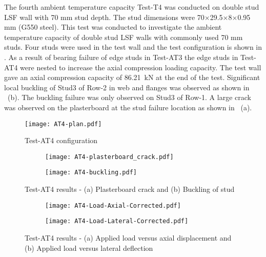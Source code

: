 The fourth ambient temperature capacity Test-T4 was conducted on double stud LSF wall with 70 mm stud depth. The stud dimensions were 70$\times$29.5$\times$8$\times$0.95 mm (G550 steel). This test was conducted to investigate the ambient temperature capacity of double stud LSF walls with commonly used 70 mm studs. Four studs were used in the test wall and the test configuration is shown in . As a result of bearing failure of edge studs in Test-AT3 the edge studs in Test-AT4 were nested to increase the axial compression loading capacity. The test wall gave an axial compression capacity of 86.21~kN at the end of the test. Significant local buckling of Stud3 of Row-2 in web and flanges was observed as shown in ~(b). The buckling failure was only observed on Stud3 of Row-1. A large crack was observed on the plasterboard at the stud failure location as shown in ~(a).
\begin{figure}[!htbp]
	\centering
			\texttt{[image: AT4-plan.pdf]}\\
		\caption{Test-AT4 configuration}
		\label{fig:AT4-plan}
\end{figure}  
\begin{figure}[!htbp]
	\centering
	\begin{subfigure}[b]{0.3\textwidth}
		\centering
		\texttt{[image: AT4-plasterboard\_crack.pdf]}
		\caption{}
		\label{subfig:AT4-plasterboard_crack}
	\end{subfigure}
	\begin{subfigure}[b]{0.3\textwidth}
		\centering
		\texttt{[image: AT4-buckling.pdf]}
		\caption{}
		\label{subfig:AT4-buckling}
	\end{subfigure}
	   \caption{Test-AT4 results - (a) Plasterboard crack and (b) Buckling of stud}
	   \label{fig:AT4-failure}
\end{figure}
\begin{figure}[!htbp]
	\centering
	\begin{subfigure}[b]{0.45\textwidth}
		\centering
		\texttt{[image: AT4-Load-Axial-Corrected.pdf]}
		\caption{}
		\label{subfig:AT4-Load-Axial-Corrected}
	\end{subfigure}
	\begin{subfigure}[b]{0.45\textwidth}
		\centering
		\texttt{[image: AT4-Load-Lateral-Corrected.pdf]}
		\caption{}
		\label{subfig:AT4-Load-Lateral-Corrected}
	\end{subfigure}
	   \caption{Test-AT4 results - (a) Applied load versus axial displacement and (b) Applied load versus lateral deflection}
	   \label{fig:AT4-results}
\end{figure}

